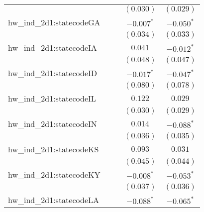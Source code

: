 \begin{center}
\begin{longtable}{l c c c c}
                         &                       &                       & $(0.030)$             & $(0.029)$             \\
hw\_ind\_2d1:statecodeGA &                       &                       & $\mathbf{-0.007}^{*}$ & $\mathbf{-0.050}^{*}$ \\
                         &                       &                       & $(0.034)$             & $(0.033)$             \\
hw\_ind\_2d1:statecodeIA &                       &                       & $0.041$               & $\mathbf{-0.012}^{*}$ \\
                         &                       &                       & $(0.048)$             & $(0.047)$             \\
hw\_ind\_2d1:statecodeID &                       &                       & $\mathbf{-0.017}^{*}$ & $\mathbf{-0.047}^{*}$ \\
                         &                       &                       & $(0.080)$             & $(0.078)$             \\
hw\_ind\_2d1:statecodeIL &                       &                       & $0.122$               & $0.029$               \\
                         &                       &                       & $(0.030)$             & $(0.029)$             \\
hw\_ind\_2d1:statecodeIN &                       &                       & $0.014$               & $\mathbf{-0.088}^{*}$ \\
                         &                       &                       & $(0.036)$             & $(0.035)$             \\
hw\_ind\_2d1:statecodeKS &                       &                       & $0.093$               & $0.031$               \\
                         &                       &                       & $(0.045)$             & $(0.044)$             \\
hw\_ind\_2d1:statecodeKY &                       &                       & $\mathbf{-0.008}^{*}$ & $\mathbf{-0.053}^{*}$ \\
                         &                       &                       & $(0.037)$             & $(0.036)$             \\
hw\_ind\_2d1:statecodeLA &                       &                       & $\mathbf{-0.088}^{*}$ & $\mathbf{-0.065}^{*}$ \\

\end{longtable}
\end{center}
